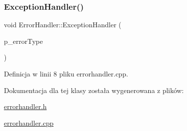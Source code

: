 \subsubsection{\texorpdfstring{Exception\+Handler()}{ExceptionHandler()}}
{\footnotesize\ttfamily void Error\+Handler\+::\+Exception\+Handler (\begin{DoxyParamCaption}\item[{\hyperlink{class_error_handler_aee61709d471d61ec7d1069369565b59a}{Error\+Handler\+::\+Error\+Type\+\_\+t}}]{p\+\_\+error\+Type }\end{DoxyParamCaption})}



Definicja w linii 8 pliku errorhandler.\+cpp.



Dokumentacja dla tej klasy została wygenerowana z plików\+:\begin{DoxyCompactItemize}
\item 
\hyperlink{errorhandler_8h}{errorhandler.\+h}\item 
\hyperlink{errorhandler_8cpp}{errorhandler.\+cpp}\end{DoxyCompactItemize}
